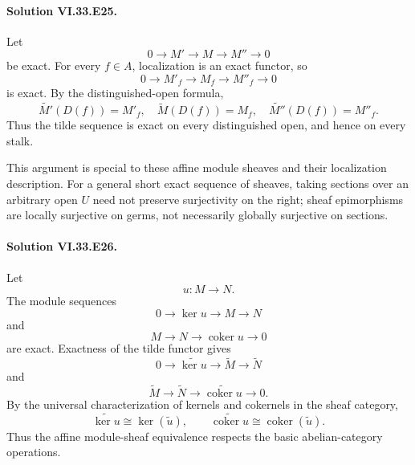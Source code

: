 \paragraph{Solution VI.33.E25.}
Let
\[
0\to M'\to M\to M''\to0
\]
be exact. For every \(f\in A\), localization is an exact functor, so
\[
0\to M'_f\to M_f\to M''_f\to0
\]
is exact. By the distinguished-open formula,
\[
\widetilde{M'}(D(f))=M'_f,\quad
\widetilde M(D(f))=M_f,\quad
\widetilde{M''}(D(f))=M''_f.
\]
Thus the tilde sequence is exact on every distinguished open, and hence on every stalk.

This argument is special to these affine module sheaves and their localization description.  For a general short
exact sequence of sheaves, taking sections over an arbitrary open \(U\) need not preserve surjectivity on the
right; sheaf epimorphisms are locally surjective on germs, not necessarily globally surjective on sections.

\paragraph{Solution VI.33.E26.}
Let
\[
u:M\to N.
\]
The module sequences
\[
0\to\ker u\to M\to N
\]
and
\[
M\to N\to\operatorname{coker}u\to0
\]
are exact.  Exactness of the tilde functor gives
\[
0\to\widetilde{\ker u}\to\widetilde M\to\widetilde N
\]
and
\[
\widetilde M\to\widetilde N\to\widetilde{\operatorname{coker}u}\to0.
\]
By the universal characterization of kernels and cokernels in the sheaf category,
\[
\boxed{
\widetilde{\ker u}\cong\ker(\widetilde u),
\qquad
\widetilde{\operatorname{coker}u}\cong\operatorname{coker}(\widetilde u).
}
\]
Thus the affine module-sheaf equivalence respects the basic abelian-category operations.
